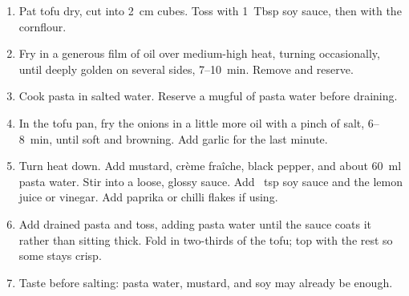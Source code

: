
\begin{ingredients}
\end{ingredients}


\begin{recipe}
  \begin{enumerate}

  \item Pat tofu dry, cut into 2~cm cubes.  Toss with 1~Tbsp soy
    sauce, then with the cornflour.

  \item Fry in a generous film of oil over medium-high heat, turning
    occasionally, until deeply golden on several sides, 7--10~min.
    Remove and reserve.

  \item Cook pasta in salted water.  Reserve a mugful of pasta water
    before draining.

  \item In the tofu pan, fry the onions in a little more oil with a
    pinch of salt, 6--8~min, until soft and browning.  Add garlic for
    the last minute.

  \item Turn heat down.  Add mustard, crème fraîche, black
    pepper, and about 60~ml pasta water.  Stir into a loose, glossy
    sauce.  Add \fracH~tsp soy sauce and the lemon juice or vinegar.
    Add paprika or chilli flakes if using.

  \item Add drained pasta and toss, adding pasta water until the
    sauce coats it rather than sitting thick.  Fold in two-thirds of
    the tofu; top with the rest so some stays crisp.

  \item Taste before salting: pasta water, mustard, and soy may
    already be enough.

  \end{enumerate}
\end{recipe}
